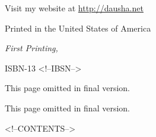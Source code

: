 \documentclass[11pt,twoside,makeidx]{memoir}
\begin{document}
  \par\noindent \theauthor
  \par\noindent Visit my website at \url{http://dausha.net}\newline

  \par\noindent Printed in the United States of America
  \newline

  \par\noindent\textit{First Printing, \usmonthyear{}}
  \newline
  
  \par\noindent ISBN-13 <!--IBSN-->
  \vspace*{\fill}
  \newpage

%
\ifdefined\isfinal
\else
  
  This page omitted in final version.
  
  \listoftodos
  \newpage
  This page omitted in final version.
  \tableofcontents
  \newpage
\fi

\mainmatter
<!--CONTENTS-->
\end{document}
